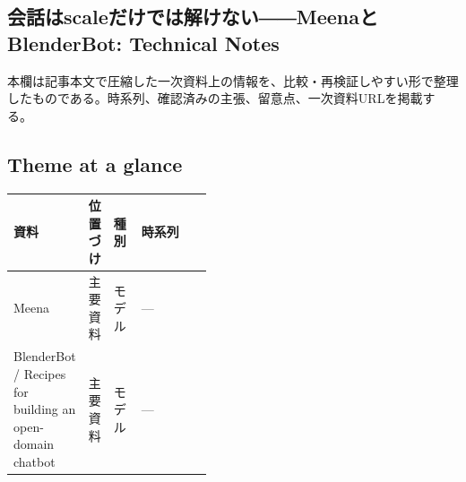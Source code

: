 \subsection*{会話はscaleだけでは解けない――MeenaとBlenderBot: Technical Notes}
本欄は記事本文で圧縮した一次資料上の情報を、比較・再検証しやすい形で整理したものである。時系列、確認済みの主張、留意点、一次資料URLを掲載する。
\smallskip
{}\par
\medskip
\subsection*{Theme at a glance}
\begin{center}
\footnotesize
\begin{tabularx}{\linewidth}{@{}p{0.20\linewidth}p{0.10\linewidth}p{0.14\linewidth}X@{}}
\toprule
資料 & 位置づけ & 種別 & 時系列 \\
\midrule
Meena & 主要資料 & モデル & — \\
BlenderBot / Recipes for building an open-domain chatbot & 主要資料 & モデル & — \\
\bottomrule
\end{tabularx}
\end{center}
\normalsize

